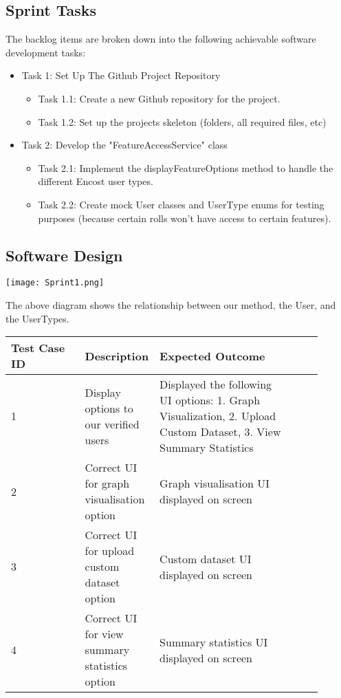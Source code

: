 \documentclass{scrreprt}
\begin{document}
\subsection{Sprint Tasks}
The backlog items are broken down into the following achievable software development tasks:

\begin{itemize}
    \item Task 1: Set Up The Github Project Repository
    \begin{itemize}
        \item Task 1.1: Create a new Github repository for the project.
        \item Task 1.2: Set up the projects skeleton (folders, all required files, etc)
    \end{itemize}
    \item Task 2: Develop the "FeatureAccessService" class
    \begin{itemize}
        \item Task 2.1: Implement the displayFeatureOptions method to handle the different Encost  user types.
        \item Task 2.2: Create mock User classes and UserType enums for testing purposes (because certain rolls won't have access to certain features).
    \end{itemize}
\end{itemize}

% 
\subsection{Software Design}

\centering
\texttt{[image: Sprint1.png]}

The above diagram shows the relationship between our method, the User, and the UserTypes.

\begin{table}[h!]
\begin{tabular}{|p{0.25\linewidth}
                |p{0.1\linewidth}
                |p{0.45\linewidth}
                |p{0.1\linewidth}|}
    \hline
    Test Case ID & Description       & Expected Outcome \\
    \hline
    1     &   Display options to our verified users   &  Displayed the following UI options: 1. Graph Visualization, 2. Upload Custom Dataset, 3. View Summary Statistics\\
    \hline
    2     &   Correct UI for graph visualisation option   &          Graph visualisation UI displayed on screen          \\
    \hline
    3     &   Correct UI for upload custom dataset option   &          Custom dataset UI displayed on screen          \\
    \hline
    4    &   Correct UI for view summary statistics option   &        Summary statistics UI displayed on screen            \\
    \hline
\end{tabular}
\end{table}
\end{document}
